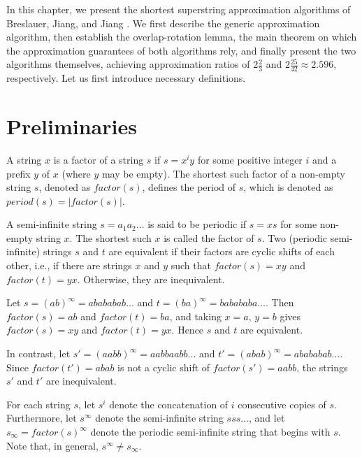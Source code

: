 In this chapter, we present the shortest superstring approximation algorithms of
Breslauer, Jiang, and Jiang \cite{Breslauer1996}. We first describe the generic
approximation algorithm, then establish the overlap-rotation lemma, the main
theorem on which the approximation guarantees of both algorithms rely, and
finally present the two algorithms themselves, achieving approximation ratios of
$2\frac{2}{3}$ and $2\frac{25}{42} \approx 2.596$, respectively. Let us first
introduce necessary definitions.

\section{Preliminaries}
\begin{definition}
A string $x$ is a factor of a string $s$ if $s = x^i y$ for some positive
integer $i$ and a prefix $y$ of $x$ (where $y$ may be empty). The shortest such
factor of a non-empty string $s$, denoted as $\textit{factor}(s)$, defines the
period of $s$, which is denoted as $\textit{period}(s) = |\textit{factor}(s)|$.
\end{definition}

\begin{definition} \label{def:semi-infinite}
A semi-infinite string $s = a_1 a_2 \dots$ is said to be periodic if $s = xs$
for some non-empty string $x$. The shortest such $x$ is called the factor of
$s$. Two (periodic semi-infinite) strings $s$ and $t$ are equivalent if their
factors are cyclic shifts of each other, i.e., if there are strings $x$ and $y$
such that $\textit{factor}(s) = xy$ and $\textit{factor}(t) = yx$. Otherwise,
they are inequivalent.
\end{definition}

\begin{example}
Let $s = (ab)^\infty = abababab\dots$ and $t = (ba)^\infty = babababa\dots$.
Then $\textit{factor}(s) = ab$ and $\textit{factor}(t) = ba$, and taking $x =
a$, $y = b$ gives $\textit{factor}(s) = xy$ and $\textit{factor}(t) = yx$. Hence
$s$ and $t$ are equivalent.

In contrast, let $s' = (aabb)^\infty = aabbaabb\dots$ and $t' = (abab)^\infty =
abababab\dots$. Since $\textit{factor}(t') = abab$ is not a cyclic shift of
$\textit{factor}(s') = aabb$, the strings $s'$ and $t'$ are inequivalent.
\end{example}

For each string $s$, let $s^i$ denote the concatenation of $i$ consecutive
copies of $s$. Furthermore, let $s^\infty$ denote the semi-infinite string $sss
\dots$, and let $s_\infty = \textit{factor}(s)^\infty$ denote the periodic
semi-infinite string that begins with $s$. Note that, in general, $s^\infty \neq
s_\infty$.

